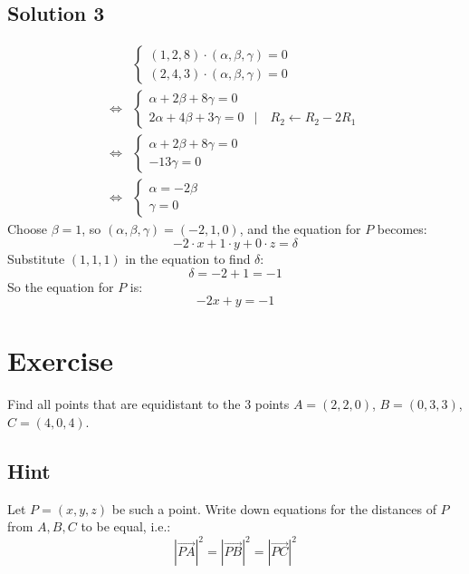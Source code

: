 \documentclass[a4paper,10pt]{article}
\begin{document}
\subsection{Solution 3}
\begin{align*}
         & \begin{cases}
               (1, 2, 8) \cdot (\alpha, \beta, \gamma) = 0 \\
               (2, 4, 3) \cdot (\alpha, \beta, \gamma) = 0
           \end{cases}                         \\
    \iff & \begin{cases}
               \alpha + 2\beta +8\gamma = 0                                        \\
               2\alpha + 4\beta + 3\gamma = 0 & | \quad R_2 \leftarrow R_2 - 2 R_1
           \end{cases} \\
    \iff & \begin{cases}
               \alpha + 2\beta +8\gamma = 0 \\
               -13\gamma = 0
           \end{cases}
    \\ \iff & \begin{cases}
        \alpha = -2\beta \\
        \gamma = 0
    \end{cases}
\end{align*}
Choose $\beta = 1$, so $(\alpha, \beta, \gamma) = (-2, 1, 0)$, and the equation for $P$ becomes:
\[
    -2\cdot x + 1\cdot y + 0\cdot z = \delta
\]
Substitute $(1, 1, 1)$ in the equation to find $\delta$:
\[
    \delta = -2 + 1 = -1
\]
So the equation for $P$ is:
\[
    -2x+y=-1
\]

\clearpage

\section{Exercise}

Find all points that are equidistant to the 3 points $A = (2, 2, 0)$, $B = (0, 3, 3)$, $C = (4, 0, 4)$.

\subsection{Hint}
Let $P=(x,y,z)$ be such a point. Write down equations for the distances of $P$ from $A,B,C$ to be equal, i.e.:
\[
    \left|\overrightarrow{PA}\right|^2 = \left|\overrightarrow{PB}\right|^2 = \left|\overrightarrow{PC}\right|^2
\]
\end{document}
